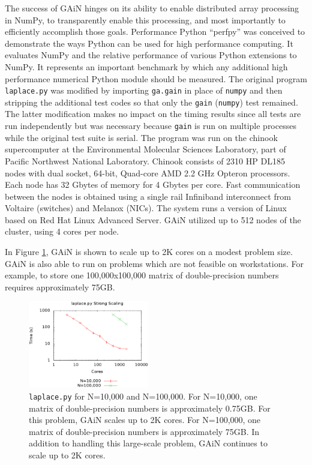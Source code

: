\documentclass[preprint]{sigplanconf}
\begin{document}
The success of GAiN hinges on its ability to enable distributed array
processing in NumPy, to transparently enable this processing, and most
importantly to efficiently accomplish those goals. Performance Python
\cite{Ram08} “perfpy” was conceived to demonstrate the ways Python can be used
for high performance computing. It evaluates NumPy and the relative
performance of various Python extensions to NumPy. It represents an important
benchmark by which any additional high performance numerical Python module
should be measured. The original program \verb=laplace.py= was modified by
importing \verb=ga.gain= in place of \verb=numpy= and then stripping the
additional test codes so that only the \verb=gain= (\verb=numpy=) test
remained. The latter modification makes no impact on the timing results since
all tests are run independently but was necessary because \verb=gain= is run
on multiple processes while the original test suite is serial.  The program
was run on the chinook supercomputer at the Environmental Molecular Sciences
Laboratory, part of Pacific Northwest National Laboratory.  Chinook consists
of 2310 HP DL185 nodes with dual socket, 64-bit, Quad-core AMD 2.2 GHz Opteron
processors. Each node has 32 Gbytes of memory for 4 Gbytes per core. Fast
communication between the nodes is obtained using a single rail Infiniband
interconnect from Voltaire (switches) and Melanox (NICs). The system runs a
version of Linux based on Red Hat Linux Advanced Server.  GAiN utilized up to
512 nodes of the cluster, using 4 cores per node.

In Figure \ref{fig:laplace}, GAiN is shown to scale up to 2K cores on a modest
problem size. GAiN is also able to run on problems which are not feasible on
workstations. For example, to store one 100,000x100,000 matrix of
double-precision numbers requires approximately 75GB.

\begin{figure}[htb]
\centering
\includegraphics[width=0.47\textwidth]{laplace.eps}
\caption{
\texttt{laplace.py} for N=10,000 and N=100,000. For N=10,000, one matrix of
double-precision numbers is approximately 0.75GB. For this problem, GAiN
scales up to 2K cores. For N=100,000, one matrix of double-precision numbers
is approximately 75GB. In addition to handling this large-scale problem, GAiN
continues to scale up to 2K cores.
}
\label{fig:laplace}
\end{figure}
\end{document}
